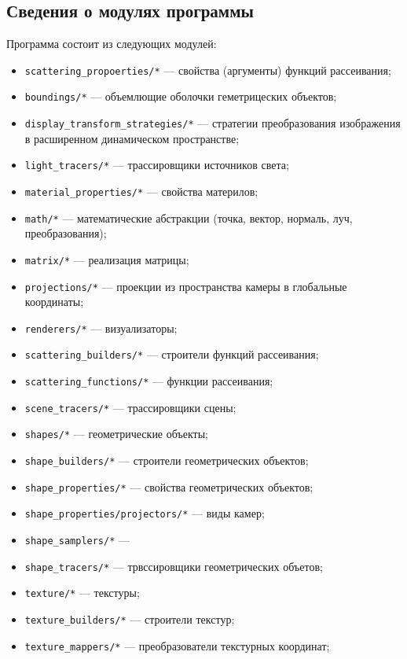 \subsection{Сведения о модулях программы}
Программа состоит из следующих модулей:
\begin{itemize}
    \item \verb|scattering_propoerties/*| --- свойства (аргументы) функций рассеивания;
    \item \verb|boundings/*| --- объемлющие оболочки геметрицеских объектов;
    \item \verb|display_transform_strategies/*| --- стратегии преобразования изображения в расширенном динамическом пространстве;
    \item \verb|light_tracers/*| --- трассировщики источников света;
    \item \verb|material_properties/*| --- свойства материлов;
    \item \verb|math/*| --- математические абстракции (точка, вектор, нормаль, луч, преобразования);
    \item \verb|matrix/*| --- реализация матрицы;
    \item \verb|projections/*| --- проекции из пространства камеры в глобальные координаты;
    \item \verb|renderers/*| --- визуализаторы;
    \item \verb|scattering_builders/*| --- строители функций рассеивания;
    \item \verb|scattering_functions/*| --- функции рассеивания;
    \item \verb|scene_tracers/*| --- трассировщики сцены;
    \item \verb|shapes/*| --- геометрические объекты;
    \item \verb|shape_builders/*| --- строители геометрических объектов;
    \item \verb|shape_properties/*| --- свойства геометрических объектов;
    \item \verb|shape_properties/projectors/*| --- виды камер;
    \item \verb|shape_samplers/*| --- 
    \item \verb|shape_tracers/*| --- трвссировщики геометрических объетов;
    \item \verb|texture/*| --- текстуры;
    \item \verb|texture_builders/*| --- строители текстур;
    \item \verb|texture_mappers/*| --- преобразователи текстурных координат;

\end{itemize}
